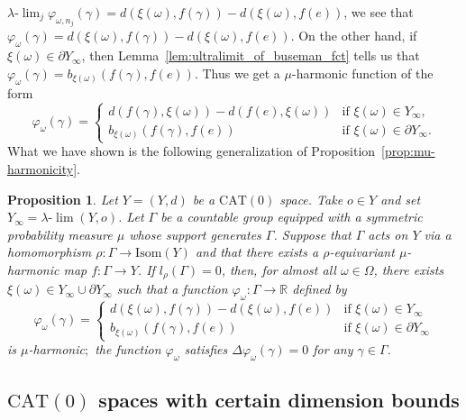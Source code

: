 \documentclass[12pt]{amsart}
\numberwithin{equation}{section}
\theoremstyle{plain}
\newtheorem{Proposition}[Theorem]{Proposition}
\theoremstyle{definition}
\theoremstyle{remark}
\newcommand{\R}{{\mathbb R}}
\newcommand{\isom}[1]{\mathrm{Isom}({#1})}
\newcommand{\cat}[1]{\mathrm{CAT}(#1)}
\newcommand{\ulim}{\lambda{\text{-}}\!\lim}
\begin{document}
 $\ulim_j\varphi_{\omega,n_j}(\gamma)=d(\xi(\omega),f(\gamma))-
 d(\xi(\omega),f(e))$, 
 we see that 
 $\varphi_{\omega}(\gamma)=d(\xi(\omega),f(\gamma))-d(\xi(\omega),f(e))$. 
 On the other hand, if $\xi(\omega)\in \partial Y_{\infty}$, then 
 Lemma~\ref{lem:ultralimit_of_buseman_fct} tells us that 
 $\varphi_{\omega}(\gamma)=b_{\xi(\omega)}(f(\gamma),f(e))$. 
 Thus we get a $\mu$-harmonic function of the form
\begin{equation*}
  \varphi_{\omega}(\gamma)=
 \begin{cases}
   d(f(\gamma),\xi(\omega)) - d(f(e),\xi(\omega)) & \text{if } 
  \xi(\omega) \in Y_{\infty}, \\
   b_{\xi(\omega)}(f(\gamma),f(e)) & \text{if } 
  \xi(\omega) \in \partial Y_{\infty}. 
 \end{cases}
\end{equation*}
What we have shown is the following generalization of
Proposition~\ref{prop:mu-harmonicity}. 

\begin{Proposition}
\label{prop:global-mu-harmonicity}
 Let $Y=(Y,d)$ be a $\cat{0}$ space. 
 Take $o \in Y$ and set $Y_{\infty}=\ulim (Y,o)$. 
 Let $\Gamma$ be a countable group equipped with a symmetric
 probability measure $\mu$ whose support generates $\Gamma$. 
 Suppose that $\Gamma$ acts on $Y$ via a homomorphism 
 $\rho\colon \Gamma \rightarrow \isom{Y}$ and that 
 there exists a $\rho$-equivariant $\mu$-harmonic map
 $f\colon \Gamma \rightarrow Y$. 
 If $l_{\rho}(\Gamma)=0$, then, for almost all $\omega \in \Omega$,
 there exists 
 $\xi(\omega) \in Y_{\infty}\cup \partial Y_{\infty}$ such that a
 function 
 $\varphi_{\omega} \colon \Gamma \rightarrow \R$ defined by 
 \begin{equation*}
  \varphi_{\omega}(\gamma) =
   \begin{cases}
    d(\xi(\omega), f(\gamma))-d(\xi(\omega), f(e)) 
    & \text{if } \xi(\omega) \in    Y_{\infty} \\
    b_{\xi(\omega)}(f(\gamma), f(e)) 
    & \text{if } \xi(\omega) \in \partial Y_{\infty}
   \end{cases}
 \end{equation*}
 is $\mu$-harmonic$;$ the function $\varphi_{\omega}$ satisfies 
 $\Delta \varphi_{\omega}(\gamma)=0$ for any $\gamma\in \Gamma$. 
\end{Proposition}


\subsection{$\cat{0}$ spaces with certain dimension bounds}
\label{sec:finite_dim_properties}
\end{document}
